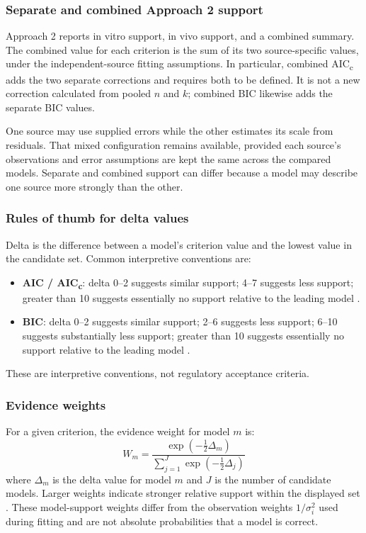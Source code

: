 \subsubsection*{Separate and combined Approach 2 support}

Approach 2 reports in vitro support, in vivo support, and a combined summary. The combined value for each criterion is the sum of its two source-specific values, under the independent-source fitting assumptions. In particular, combined AIC\textsubscript{c} adds the two separate corrections and requires both to be defined. It is not a new correction calculated from pooled $n$ and $k$; combined BIC likewise adds the separate BIC values.

One source may use supplied errors while the other estimates its scale from residuals. That mixed configuration remains available, provided each source's observations and error assumptions are kept the same across the compared models. Separate and combined support can differ because a model may describe one source more strongly than the other.

\subsubsection*{Rules of thumb for delta values}

Delta is the difference between a model's criterion value and the lowest value in the candidate set. Common interpretive conventions are:

\begin{itemize}
    \item \textbf{AIC / AIC\textsubscript{c}}: delta 0--2 suggests similar support; 4--7 suggests less support; greater than 10 suggests essentially no support relative to the leading model \cite{burnham2002}.
    \item \textbf{BIC}: delta 0--2 suggests similar support; 2--6 suggests less support; 6--10 suggests substantially less support; greater than 10 suggests essentially no support relative to the leading model \cite{kass1995}.
\end{itemize}

These are interpretive conventions, not regulatory acceptance criteria.

\subsubsection*{Evidence weights}

For a given criterion, the evidence weight for model $m$ is:
\begin{equation}
W_m = \frac{\exp\left(-\frac{1}{2}\Delta_m\right)}{\sum_{j=1}^{J} \exp\left(-\frac{1}{2}\Delta_j\right)}
\end{equation}
where $\Delta_m$ is the delta value for model $m$ and $J$ is the number of candidate models. Larger weights indicate stronger relative support within the displayed set \cite{burnham2002, wagenmakers2004}. These model-support weights differ from the observation weights $1/\sigma_i^2$ used during fitting and are not absolute probabilities that a model is correct.

